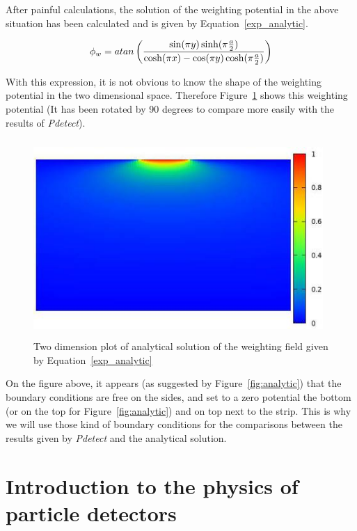 \documentclass[11pt]{article}
\begin{document}
		After painful calculations, the solution of the weighting potential in the above situation
		has been calculated and is given by Equation~\ref{exp_analytic}.

		\begin{equation}
			\phi_w = atan\left({\sin(\pi y)\sinh(\pi {a\over{2}})\over
					{\cosh(\pi x)-\cos(\pi y)\cosh(\pi {a\over{2}})}}\right)
			\label{exp_analytic}
		\end{equation}

		With this expression, it is not obvious to know the shape of the weighting potential in the
		two dimensional space. Therefore Figure~\ref{fig:plot_analytic} shows this weighting potential
		(It has been rotated by 90 degrees to compare more easily with the results of \textit{Pdetect}).

		\begin{figure}[H]
			\center
			\includegraphics[height=7.5cm,width=11cm]{images/boundary_conditions/detector/plot_analytic.png}
			\caption{Two dimension plot of analytical solution of the weighting field given by
				Equation~\ref{exp_analytic}}
			\label{fig:plot_analytic}
		\end{figure}

		On the figure above, it appears (as suggested by Figure~\ref{fig:analytic}) that the boundary
		conditions are free on the sides, and set to a zero potential  the bottom (or on the top for
		Figure~\ref{fig:analytic}) and on top next to the strip. This is why we will use those kind
		of boundary conditions for the comparisons between the results given by \textit{Pdetect} and
		the analytical solution.

\section{Introduction to the physics of particle detectors}
\end{document}
